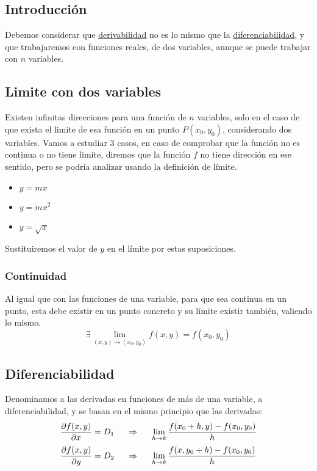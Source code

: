 \subsection{Introducción}
\noindent Debemos considerar que \underline{derivabilidad} no es lo mismo que la \underline{diferenciabilidad}, y que trabajaremos con funciones reales, de dos variables, aunque se puede trabajar con \(n\) variables.
\subsection{Limite con dos variables}
\noindent Existen infinitas direcciones para una función de \(n\) variables, solo en el caso de que exista el limite de esa función en un punto \(P(x_0,y_0)\), considerando dos variables. Vamos a estudiar 3 casos, en caso de comprobar que la función no es continua o no tiene limite, diremos que la función \(f\) no tiene dirección en ese sentido, pero se podría analizar usando la definición de límite.
\begin{itemize}
        \item \(y = mx\)
        \item \(y = mx^2\)
        \item \(y = \sqrt{x}\)
\end{itemize}
\noindent Sustituiremos el valor de \(y\) en el límite por estas suposiciones.
\subsubsection{Continuidad}
\noindent Al igual que con las funciones de una variable, para que sea continua en un punto, esta debe existir en un punto concreto y su límite existir también, valiendo lo mismo.
\[
        \boxed{\exists \lim_{(x,y) \rightarrow  (x_0,y_0)}f(x,y) = f(x_0,y_0)}
\]
\subsection{Diferenciabilidad}
\noindent Denominamos a las derivadas en funciones de más de una variable, a diferenciabilidad, y se basan en el mismo principio que las derivadas:
\[
        \frac{\partial f(x,y)}{\partial x} =D_1 \hspace{.5cm}\Rightarrow  \hspace{.5cm}\lim_{h\rightarrow k} \frac{f(x_0+h,y)-f(x_0,y_0)}{h}
\]
\[
        \frac{\partial f(x,y)}{\partial y} =D_2 \hspace{.5cm}\Rightarrow  \hspace{.5cm}\lim_{h\rightarrow k} \frac{f(x,y_0+h)-f(x_0,y_0)}{h}
\]

